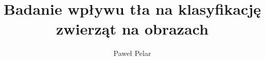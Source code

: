 \documentclass[magister,druk]{dyplom}
\author{Paweł Pelar}
\title{Badanie wpływu tła na klasyfikację zwierząt na obrazach}
\begin{document}
\maketitle



\tableofcontents














\listoffigures
\listoflistings
\listoftables

\appendixpage
\appendix

\end{document}
